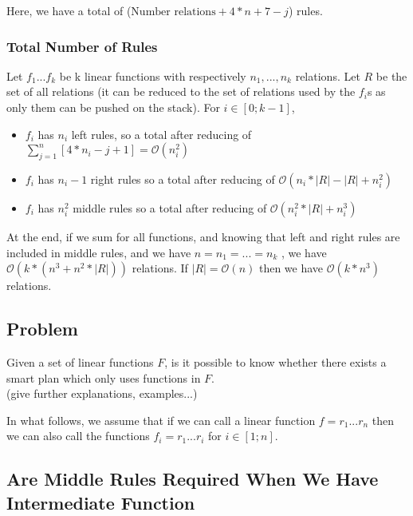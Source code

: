 \documentclass[10pt,a4paper,draft]{article}
\begin{document}
Here, we have a total of ($\textrm{Number relations} + 4 * n + 7 - j$) rules.

\subsubsection{Total Number of Rules}

Let $f_1 ... f_k$ be k linear functions with respectively $n_1, ..., n_k$ relations. Let $R$ be the set of all relations (it can be reduced to the set of relations used by the $f_i$s as only them can be pushed on the stack). For $i \in [0; k-1]$,
\begin{itemize}
\item $f_i$ has $n_i$ left rules, so a total after reducing of $\sum\limits_{j=1}^n [4 * n_i - j + 1] = \mathcal{O}(n_i^2)$
\item $f_i$ has $n_i - 1$ right rules so a total after reducing of $\mathcal{O}(n_i * |R| - |R| + n_i^2)$
\item $f_i$ has $n_i^2$ middle rules so a total after reducing of $\mathcal{O}(n_i^2 * |R| + n_i^3)$
\end{itemize}

At the end, if we sum for all functions, and knowing that left and right rules are included in middle rules, and we have $n = n_1 = ... = n_k$ , we have $\mathcal{O}(k*(n^3 + n^2 * |R|))$ relations. If $|R| = \mathcal{O}(n)$ then we have $\mathcal{O}(k * n^3)$ relations.

\subsection{Problem}

Given a set of linear functions $F$, is it possible to know whether there exists a smart plan which only uses functions in $F$.\\
(give further explanations, examples...)

\begin{hypothesis}
\label{intermediatefunctions}
In what follows, we assume that if we can call a linear function $f = r_1 ... r_n$ then we can also call the functions $f_i = r_1 ... r_i$ for $i \in [1; n]$.

\end{hypothesis}

\subsection{Are Middle Rules Required When We Have Intermediate Function}
\end{document}
